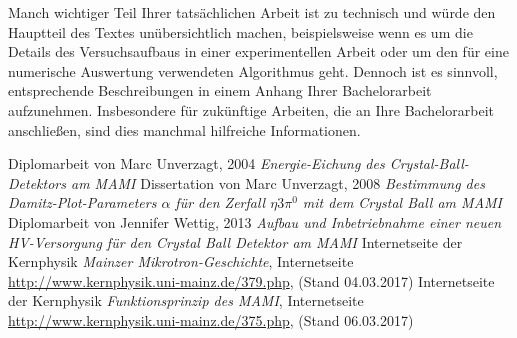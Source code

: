 \documentclass[a4paper,11pt,oneside,final,german,openbib,pdftex]{scrbook}
\begin{document}
\begin{appendix}
Manch wichtiger Teil Ihrer tats\"achlichen Arbeit ist zu technisch 
und w\"urde den Hauptteil des Textes un\"ubersichtlich machen, 
beispielsweise wenn es um die Details des Versuchsaufbaus in einer 
experimentellen Arbeit oder um den f\"ur eine numerische Auswertung 
verwendeten Algorithmus geht. Dennoch ist es sinnvoll, entsprechende 
Beschreibungen in einem Anhang Ihrer Bachelorarbeit aufzunehmen. 
Insbesondere f\"ur zuk\"unftige Arbeiten, die an Ihre Bachelorarbeit 
anschlie{\ss}en, sind dies manchmal hilfreiche Informationen.





\renewcommand{\bibname}{\bfont Literaturverzeichnis} 

\begin{thebibliography}{99}
	
 Diplomarbeit von Marc Unverzagt, 2004 {\em Energie-Eichung des Crystal-Ball-Detektors am MAMI}
 Dissertation von Marc Unverzagt, 2008 {\em Bestimmung des Damitz-Plot-Parameters $\alpha$ für den Zerfall $ \eta 3\pi^{0} $ mit dem Crystal Ball am MAMI}
 Diplomarbeit von Jennifer Wettig, 2013 {\em Aufbau und Inbetriebnahme einer neuen HV-Versorgung für den Crystal Ball Detektor am MAMI}
 Internetseite der Kernphysik {\em Mainzer Mikrotron-Geschichte}, Internetseite \url{http://www.kernphysik.uni-mainz.de/379.php}, (Stand 04.03.2017)
 Internetseite der Kernphysik {\em Funktionsprinzip des MAMI}, Internetseite \url{http://www.kernphysik.uni-mainz.de/375.php}, (Stand 06.03.2017)


\end{thebibliography}
\end{appendix}
\end{document}
